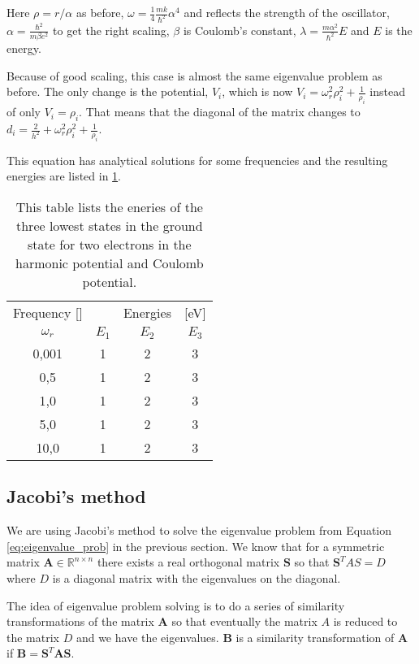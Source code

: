 Here $\rho = r/\alpha$ as before, $\omega = \frac{1}{4}\frac{mk}{\hbar^2}\alpha^4$ and reflects the strength of the oscillator, $\alpha = \frac{\hbar^2}{m \beta e^2}$ to get the right scaling, $\beta$ is Coulomb's constant, $\lambda = \frac{m\alpha^2}{\hbar^2}E$ and $E$ is the energy.

Because of good scaling, this case is almost the same eigenvalue problem as before. The only change is the potential, $V_i$, which is now $V_i = \omega_r^2 \rho_i^2+ \frac{1}{\rho_i}$ instead of only $V_i = \rho_i$. That means that the diagonal of the matrix changes to $d_i = \frac{2}{h^2} + \omega_r^2\rho_i^2 + \frac{1}{\rho_i}$.

This equation has analytical solutions for some frequencies and the resulting energies are listed in \ref{tab:analytical_energies}.

\begin{table}[H]\caption{This table lists the eneries of the three lowest states in the ground state for two electrons in the harmonic potential and Coulomb potential.}\label{tab:analytical_energies}
\begin{tabular}{cccc}
Frequency [] & & Energies & [eV]\\
$\omega_r$ & $E_1$ & $E_2$ & $E_3$\\\hline
0,001 & 1 & 2 & 3\\
0,5 & 1 & 2 & 3\\
1,0 & 1 & 2 & 3\\
5,0 & 1 & 2 & 3\\
10,0 & 1 & 2 & 3\\
\end{tabular}
\end{table}

\subsection{Jacobi's method}

We are using Jacobi's method to solve the eigenvalue problem from Equation \ref{eq:eigenvalue_prob} in the previous section. We know that for a symmetric matrix $\textbf{A} \in \mathbb{R}^{n\times n}$ there exists a real orthogonal matrix $\textbf{S}$ so that $ \textbf{S}^{T}AS = D$ where $D$ is a diagonal matrix with the eigenvalues on the diagonal.

The idea of eigenvalue problem solving is to do a series of similarity transformations of the matrix $\textbf{A}$ so that eventually the matrix $A$ is reduced to the matrix $D$ and we have the eigenvalues. $\textbf{B}$ is a similarity transformation of $\textbf{A}$ if $\textbf{B} = \textbf{S}^T\textbf{A}\textbf{S}$.

